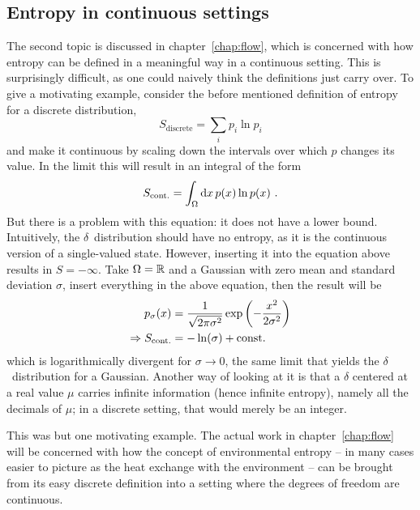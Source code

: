 \subsection{Entropy in continuous settings}

The second topic is discussed in chapter~\ref{chap:flow}, which is concerned with how entropy can be defined in a meaningful way in a continuous setting. This is surprisingly difficult, as one could naively think the definitions just carry over. To give a motivating example, consider the before mentioned definition of entropy for a discrete distribution,
%
\begin{equation}
	S_\text{discrete} = \sum_ip_i\ln p_i
\end{equation}
%
and make it continuous by scaling down the intervals over which \(p\) changes its value. In the limit this will result in an integral of the form
%
\begin{equation}
	S_\text{cont.} = \int_\Omega\mathrm{d} x\,p(x)\ln p(x) ~.
\end{equation}
%
But there is a problem with this equation: it does not have a lower bound. Intuitively, the \(\delta\)~distribution should have no entropy, as it is the continuous version of a single-valued state. However, inserting it into the equation above results in \(S = -\infty\). Take \(\Omega = \mathbb{R}\) and a Gaussian with zero mean and standard deviation \(\sigma\), insert everything in the above equation, then the result will be
%
\begin{align}
	p_\sigma(x) &= \frac1{\sqrt{2\pi\sigma^2}} \operatorname{exp}\left(-\frac{x^2}{2\sigma^2}\right) \\
	\Rightarrow S_\text{cont.} &= -\ln(\sigma) + \mathrm{const.}
\end{align}
%
which is logarithmically divergent for \(\sigma\to0\), the same limit that yields the \(\delta\)~distribution for a Gaussian. Another way of looking at it is that a \(\delta\) centered at a real value \(\mu\) carries infinite information (hence infinite entropy), namely all the decimals of \(\mu\); in a discrete setting, that would merely be an integer.

This was but one motivating example. The actual work in chapter~\ref{chap:flow} will be concerned with how the concept of environmental entropy -- in many cases easier to picture as the heat exchange with the environment -- can be brought from its easy discrete definition into a setting where the degrees of freedom are continuous.





